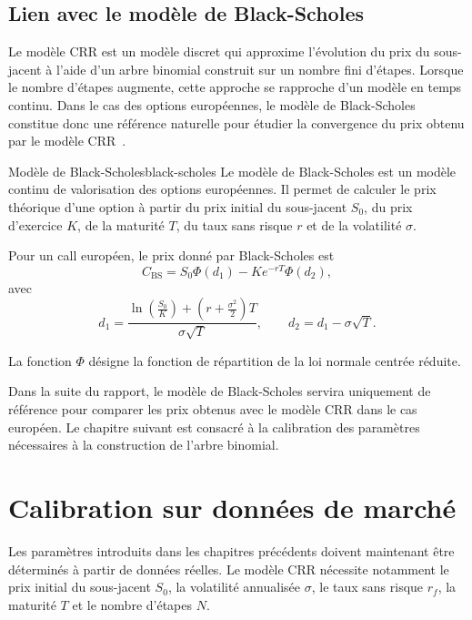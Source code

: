 \documentclass[11pt]{report}
\begin{document}
\section{Lien avec le modèle de Black-Scholes}
\label{sec:lien-black-scholes}

Le modèle CRR est un modèle discret qui approxime l'évolution du prix du sous-jacent à l'aide d'un arbre binomial construit sur un nombre fini d'étapes. Lorsque le nombre d'étapes augmente, cette approche se rapproche d'un modèle en temps continu. Dans le cas des options européennes, le modèle de Black-Scholes constitue donc une référence naturelle pour étudier la convergence du prix obtenu par le modèle CRR~\cite{black1973,merton1973}.

\begin{definition}{Modèle de Black-Scholes}{black-scholes}
Le modèle de Black-Scholes est un modèle continu de valorisation des options européennes. Il permet de calculer le prix théorique d'une option à partir du prix initial du sous-jacent $S_0$, du prix d'exercice $K$, de la maturité $T$, du taux sans risque $r$ et de la volatilité $\sigma$.
\end{definition}

Pour un call européen, le prix donné par Black-Scholes est
\[
C_{\mathrm{BS}} = S_0 \Phi(d_1) - K e^{-rT}\Phi(d_2),
\]
avec
\[
d_1 =
\frac{
\ln\left(\frac{S_0}{K}\right)
+
\left(r + \frac{\sigma^2}{2}\right)T
}
{\sigma\sqrt{T}},
\qquad
d_2 = d_1 - \sigma\sqrt{T}.
\]

La fonction $\Phi$ désigne la fonction de répartition de la loi normale centrée réduite.

Dans la suite du rapport, le modèle de Black-Scholes servira uniquement de référence pour comparer les prix obtenus avec le modèle CRR dans le cas européen. Le chapitre suivant est consacré à la calibration des paramètres nécessaires à la construction de l'arbre binomial.


\chapter{Calibration sur données de marché}

Les paramètres introduits dans les chapitres précédents doivent maintenant être déterminés à partir de données réelles. Le modèle CRR nécessite notamment le prix initial du sous-jacent $S_0$, la volatilité annualisée $\sigma$, le taux sans risque $r_f$, la maturité $T$ et le nombre d'étapes $N$.
\end{document}

